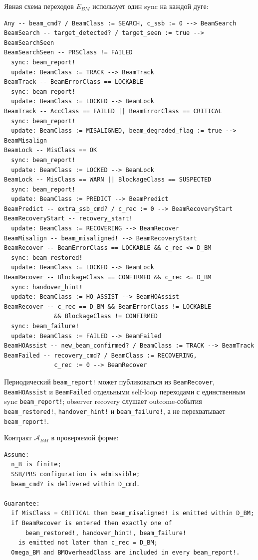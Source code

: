 \documentclass[10pt,a4paper]{article}
\newcommand{\code}[1]{\texttt{#1}}
\newcommand{\A}[1]{\mathcal{A}_{#1}}
\begin{document}
Явная схема переходов \(E_{BM}\) использует один sync на каждой дуге:
\begin{verbatim}
Any -- beam_cmd? / BeamClass := SEARCH, c_ssb := 0 --> BeamSearch
BeamSearch -- target_detected? / target_seen := true --> BeamSearchSeen
BeamSearchSeen -- PRSClass != FAILED
  sync: beam_report!
  update: BeamClass := TRACK --> BeamTrack
BeamTrack -- BeamErrorClass == LOCKABLE
  sync: beam_report!
  update: BeamClass := LOCKED --> BeamLock
BeamTrack -- AccClass == FAILED || BeamErrorClass == CRITICAL
  sync: beam_report!
  update: BeamClass := MISALIGNED, beam_degraded_flag := true --> BeamMisalign
BeamLock -- MisClass == OK
  sync: beam_report!
  update: BeamClass := LOCKED --> BeamLock
BeamLock -- MisClass == WARN || BlockageClass == SUSPECTED
  sync: beam_report!
  update: BeamClass := PREDICT --> BeamPredict
BeamPredict -- extra_ssb_cmd? / c_rec := 0 --> BeamRecoveryStart
BeamRecoveryStart -- recovery_start!
  update: BeamClass := RECOVERING --> BeamRecover
BeamMisalign -- beam_misaligned! --> BeamRecoveryStart
BeamRecover -- BeamErrorClass == LOCKABLE && c_rec <= D_BM
  sync: beam_restored!
  update: BeamClass := LOCKED --> BeamLock
BeamRecover -- BlockageClass == CONFIRMED && c_rec <= D_BM
  sync: handover_hint!
  update: BeamClass := HO_ASSIST --> BeamHOAssist
BeamRecover -- c_rec == D_BM && BeamErrorClass != LOCKABLE
              && BlockageClass != CONFIRMED
  sync: beam_failure!
  update: BeamClass := FAILED --> BeamFailed
BeamHOAssist -- new_beam_confirmed? / BeamClass := TRACK --> BeamTrack
BeamFailed -- recovery_cmd? / BeamClass := RECOVERING,
              c_rec := 0 --> BeamRecover
\end{verbatim}
Периодический \code{beam\_report!} может публиковаться из \code{BeamRecover}, \code{BeamHOAssist} и \code{BeamFailed} отдельными self-loop переходами с единственным sync \code{beam\_report!}; observer recovery слушает outcome-события \code{beam\_restored!}, \code{handover\_hint!} и \code{beam\_failure!}, а не перехватывает \code{beam\_report!}.

Контракт \(\A{BM}\) в проверяемой форме:
\begin{verbatim}
Assume:
  n_B is finite;
  SSB/PRS configuration is admissible;
  beam_cmd? is delivered within D_cmd.

Guarantee:
  if MisClass = CRITICAL then beam_misaligned! is emitted within D_BM;
  if BeamRecover is entered then exactly one of
      beam_restored!, handover_hint!, beam_failure!
    is emitted not later than c_rec = D_BM;
  Omega_BM and BMOverheadClass are included in every beam_report!.
\end{verbatim}
\end{document}
